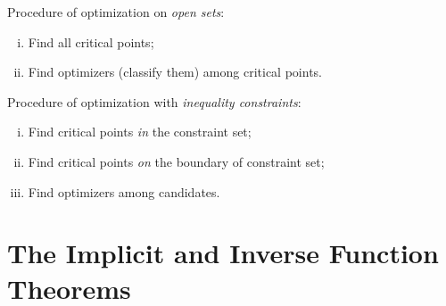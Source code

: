 \documentclass[11pt]{article}
\begin{document}
			\begin{remark}Procedure of optimization on \emph{open sets}:
				\begin{enumerate}[(i)]
					\item Find all critical points;
					\item Find optimizers (classify them) among critical points.
				\end{enumerate}
			\end{remark}
			
			\begin{remark}Procedure of optimization with \emph{inequality constraints}:
				\begin{enumerate}[(i)]
					\item Find critical points \emph{in} the constraint set;
					\item Find critical points \emph{on} the boundary of constraint set;
					\item Find optimizers among candidates.
				\end{enumerate}
			\end{remark}
	
	\section{The Implicit and Inverse Function Theorems}
\end{document}
